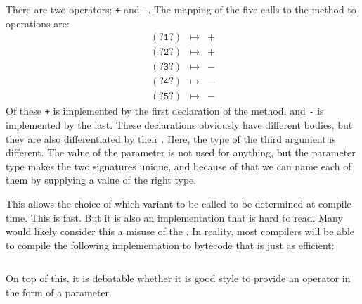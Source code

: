 There are two operators; \texttt{+} and \texttt{-}. The mapping of the five calls to the  method to operations are:
\begin{eqnarray*}
    \mathtt{(?1?)} &\mapsto& \mathtt{+} \\
    \mathtt{(?2?)} &\mapsto& \mathtt{+} \\
    \mathtt{(?3?)} &\mapsto& \mathtt{-} \\
    \mathtt{(?4?)} &\mapsto& \mathtt{-} \\
    \mathtt{(?5?)} &\mapsto& \mathtt{-}
\end{eqnarray*}
Of these \texttt{+} is implemented by the first declaration of the  method, and \texttt{-} is implemented by the last. These declarations obviously have different bodies, but they are also differentiated by their . Here, the type of the third argument is different. The value of the parameter is not used for anything, but the parameter type makes the two signatures unique, and because of that we can name each of them by supplying a value of the right type.

This allows the choice of which  variant to be called to be determined at compile time. This is fast. But it is also an implementation that is hard to read. Many would likely consider this a misuse of the . In reality, most compilers will be able to compile the following implementation to bytecode that is just as efficient:

\inputminted{csharp}{\context/answer/OperatorTest.cs}

On top of this, it is debatable whether it is good style to provide an operator in the form of a parameter.

